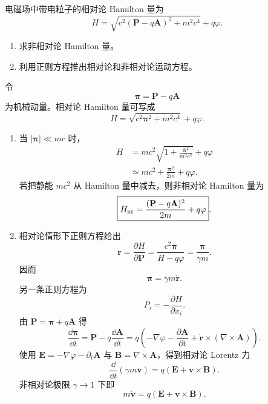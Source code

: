 \begin{question}
电磁场中带电粒子的相对论 Hamilton 量为
\[
  H=\sqrt{c^2(\mathbf P-q\mathbf A)^2+m^2c^4}+q\varphi .
\]
\begin{enumerate}
  \item 求非相对论 Hamilton 量。
  \item 利用正则方程推出相对论和非相对论运动方程。
\end{enumerate}
\begin{solution}
令
\[
  \boldsymbol\pi=\mathbf P-q\mathbf A
\]
为机械动量。相对论 Hamilton 量可写成
\[
  H=\sqrt{c^2\boldsymbol\pi^2+m^2c^4}+q\varphi .
\]
\begin{enumerate}
  \item 当 $|\boldsymbol\pi|\ll mc$ 时，
  \[
  \begin{aligned}
    H&=mc^2\sqrt{1+\frac{\boldsymbol\pi^2}{m^2c^2}}+q\varphi \\
    &\simeq mc^2+\frac{\boldsymbol\pi^2}{2m}+q\varphi .
  \end{aligned}
  \]
  若把静能 $mc^2$ 从 Hamilton 量中减去，则非相对论 Hamilton 量为
  \[
    \boxed{H_{\rm nr}=\frac{(\mathbf P-q\mathbf A)^2}{2m}+q\varphi} .
  \]

  \item 相对论情形下正则方程给出
  \[
    \dot{\mathbf r}=\frac{\partial H}{\partial \mathbf P}
    =\frac{c^2\boldsymbol\pi}{H-q\varphi}
    =\frac{\boldsymbol\pi}{\gamma m} .
  \]
  因而
  \[
    \boldsymbol\pi=\gamma m\dot{\mathbf r} .
  \]
  另一条正则方程为
  \[
    \dot{P}_i=-\frac{\partial H}{\partial x_i} .
  \]
  由 $\mathbf P=\boldsymbol\pi+q\mathbf A$ 得
  \[
    \frac{\dd{\boldsymbol\pi}}{\dd{t}}
    =\dot{\mathbf P}-q\frac{\dd{\mathbf A}}{\dd{t}}
    =q\left(-\nabla\varphi-\frac{\partial\mathbf A}{\partial t}
      +\dot{\mathbf r}\times(\nabla\times\mathbf A)\right).
  \]
  使用 $\mathbf E=-\nabla\varphi-\partial_t\mathbf A$ 与 $\mathbf B=\nabla\times\mathbf A$，得到相对论 Lorentz 力
  \[
    \boxed{\frac{\dd}{\dd{t}}(\gamma m\mathbf v)=q(\mathbf E+\mathbf v\times\mathbf B)} .
  \]
  非相对论极限 $\gamma\to1$ 下即
  \[
    \boxed{m\dot{\mathbf v}=q(\mathbf E+\mathbf v\times\mathbf B)} .
  \]
\end{enumerate}
\end{solution}
\end{question}
